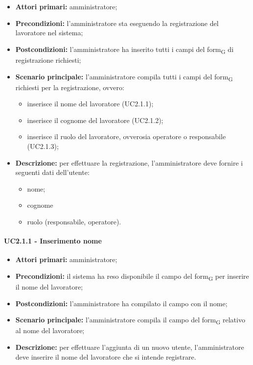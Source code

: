 \begin{itemize}
	\item 	\textbf{Attori primari:} amministratore;
	\item 	\textbf{Precondizioni:}	l'amministratore sta eseguendo la registrazione del lavoratore nel sistema;
	\item 	\textbf{Postcondizioni:} l'amministratore ha inserito tutti i campi del \gls{form}\textsubscript{G} di registrazione richiesti;
	\item 	\textbf{Scenario principale:} l'amministratore compila tutti i campi del \gls{form}\textsubscript{G} richiesti per la registrazione, ovvero:
	\begin{itemize}
		\item inserisce il nome del lavoratore (UC2.1.1);
		\item inserisce il cognome del lavoratore (UC2.1.2);
		\item inserisce il ruolo del lavoratore, ovverosia operatore o responsabile (UC2.1.3);
	\end{itemize}
	\item 	\textbf{Descrizione:} per effettuare la registrazione, l'amministratore deve fornire i seguenti dati dell'utente:
	\begin{itemize}
		\item nome;
		\item cognome
		\item ruolo (responsabile, operatore).
	\end{itemize}

\end{itemize}

\paragraph{UC2.1.1 - Inserimento nome}
\begin{itemize}
	\item 	\textbf{Attori primari:} amministratore;
	\item 	\textbf{Precondizioni:} il sistema ha reso disponibile il campo del \gls{form}\textsubscript{G} per inserire il nome del lavoratore;
	\item 	\textbf{Postcondizioni:} l'amministratore ha compilato il campo con il nome;
	\item 	\textbf{Scenario principale:} l'amministratore compila il campo del \gls{form}\textsubscript{G} relativo al nome del lavoratore;
	\item 	\textbf{Descrizione:} per effettuare l'aggiunta di un nuovo utente, l'amministratore deve inserire il nome del lavoratore che si intende registrare.

\end{itemize}

